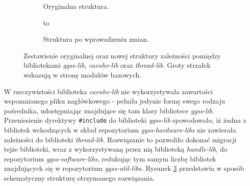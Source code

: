 \begin{figure}[H]
\centering
\begin{subfigure}[t]{0.40\textwidth}
\centering
\usebox{\mybox}
\caption{Oryginalna struktura.}
\label{fig:dependency_problem_old}
\end{subfigure}
\hfill
\begin{subfigure}[t]{0.55\textwidth}
\centering
\vbox to \ht{}
\caption{Struktura po wprowadzeniu zmian.}
\label{fig:dependency_problem_solved}
\end{subfigure}

\caption{Zestawienie oryginalnej oraz nowej struktury zależności pomiędzy bibliotekami \emph{ggss-lib}, \emph{caenhv-lib} oraz \emph{thread-lib}. Groty strzałek wskazują w stronę modułów bazowych.}
\end{figure}

W rzeczywistości biblioteka \emph{caenhv-lib} nie wykorzystywała zawartości wspomnianego pliku nagłówkowego - pełniła jedynie formę swego rodzaju pośrednika, udostępniając znajdujące się tam klasy bibliotece \emph{ggss-lib}. Przeniesienie dyrektywy \lstinline{#include} do biblioteki \emph{ggss-lib} spowodowało, iż żadna z bibliotek wchodzących w skład repozytorium \emph{ggss-hardware-libs} nie zawierała zależności do biblioteki \emph{thread-lib}. Rozwiązanie to pozwoliło dokonać migracji tejże biblioteki, wraz z wykorzystywaną przez nią biblioteką \emph{handle-lib}, do repozytorium \emph{ggss-software-libs}, redukując tym samym liczbę bibliotek znajdujących się w repozytorium \emph{ggss-util-libs}. Rysunek \ref{fig:dependency_problem_solved} przedstawia w sposób schematyczny strukturę otrzymanego rozwiązania.

